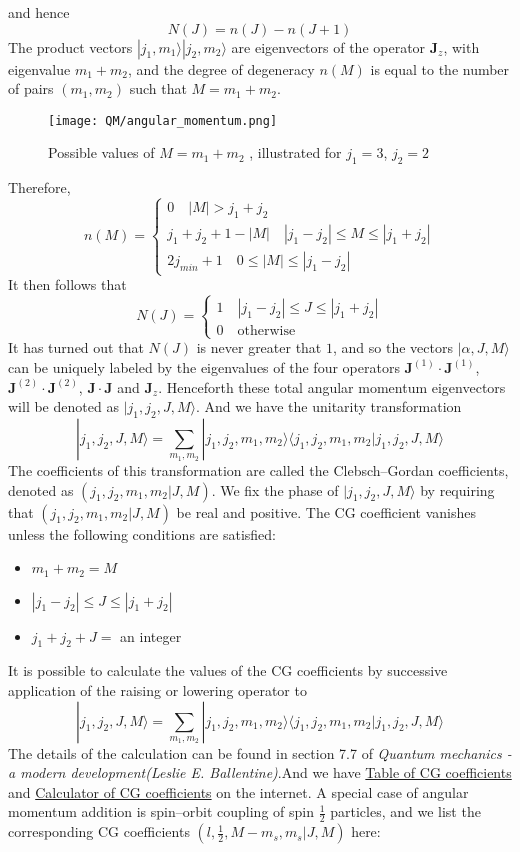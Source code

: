 \documentclass[cyan]{elegantnote}
\begin{document}
and hence
\[N(J) = n(J) - n(J+1)\]
The product vectors $|j_1,m_1\rangle |j_2,m_2\rangle$ are eigenvectors of the operator $\bm{J}_z$, with eigenvalue $m_1+m_2$, and the degree of degeneracy $n(M)$ is equal to the number of pairs $(m_1,m_2)$ such that $M=m_1+m_2$.
\begin{figure}[!h]
	\centering
	\texttt{[image: QM/angular\_momentum.png]}
	\caption{Possible values of $M=m_1+m_2$ , illustrated for $j_1=3$, $j_2=2$}
\end{figure}
Therefore,
\[n(M)=\begin{cases} 0 \quad |M| > j_1 + j_2\\ j_1+j_2+1-|M|\quad |j_1-j_2| \leq M \leq |j_1+j_2|\\ 2j_{min}+1 \quad 0 \leq |M|\leq |j_1-j_2|\end{cases} \]
It then follows that
\[N(J)=\begin{cases} 1 \quad |j_1-j_2| \leq J \leq |j_1+j_2|\\ 0 \quad \mbox{otherwise}\end{cases} \]
It has turned out that $N(J)$ is never greater that $1$, and so the vectors $|\alpha, J, M \rangle$ can be uniquely labeled by the eigenvalues of the four operators $\bm{J}^{(1)}\cdot\bm{J}^{(1)}$, $\bm{J}^{(2)}\cdot\bm{J}^{(2)}$, $\bm{J}\cdot\bm{J}$ and $\bm{J}_z$. Henceforth these total angular momentum
eigenvectors will be denoted as $|j_1,j_2,J,M\rangle$. And we have the unitarity transformation 
\[|j_1,j_2,J,M\rangle = \sum_{m_1,m_2} |j_1,j_2,m_1,m_2\rangle \langle j_1,j_2,m_1,m_2 | j_1,j_2,J,M\rangle\]
The coefficients of this transformation are called the Clebsch–Gordan coefficients, denoted as $(j_1,j_2,m_1,m_2|J,M)$. We fix the phase of $|j_1, j_2, J, M\rangle$ by requiring that $(j_1,j_2,m_1,m_2|J,M)$ be real and positive. The CG coefficient vanishes unless the following conditions are satisfied:
\begin{itemize}
\item $m_1+m_2=M$
\item $|j_1-j_2| \leq J \leq |j_1+j_2|$
\item $j_1+j_2+J =$ an integer
\end{itemize}
It is possible to calculate the values of the CG coefficients by successive application of the raising or lowering operator to
\[|j_1,j_2,J,M\rangle = \sum_{m_1,m_2} |j_1,j_2,m_1,m_2\rangle \langle j_1,j_2,m_1,m_2 | j_1,j_2,J,M\rangle\]
The details of the calculation can be found in section 7.7 of \emph{Quantum mechanics - a modern development(Leslie E. Ballentine)}.And we have \href{https://en.wikipedia.org/wiki/Table_of_Clebsch-Gordan_coefficients}{Table of CG coefficients} and \href{http://www.wolframalpha.com/input/?i=CG+coefficient}{Calculator of CG coefficients} on the internet. A special case of angular momentum addition is spin–orbit coupling of spin $\frac{1}{2}$ particles, and we list the corresponding CG coefficients $(l,\frac{1}{2}, M-m_s, m_s|J,M)$ here:
\end{document}
